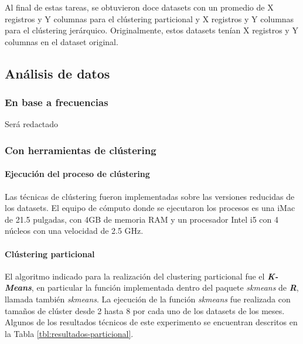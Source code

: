 \documentclass[12pt]{article}
\numberwithin{equation}{section}
\numberwithin{table}{section}
\numberwithin{figure}{section}
\begin{document}
Al final de estas tareas, se obtuvieron doce datasets con un promedio de X registros y Y columnas para el clústering particional y X registros y Y columnas para el clústering jerárquico. Originalmente, estos datasets tenían X registros y Y columnas en el dataset original.

\subsection{Análisis de datos}
\subsubsection{En base a frecuencias}
Será redactado
\subsubsection{Con herramientas de clústering}
\paragraph{Ejecución del proceso de clústering}
Las técnicas de clústering fueron implementadas sobre las versiones reducidas de los datasets. El equipo de cómputo donde se ejecutaron los procesos es una iMac de 21.5 pulgadas, con 4GB de memoria RAM y un procesador Intel i5 con 4 núcleos con una velocidad de 2.5 GHz.

\paragraph{Clústering particional}
El algoritmo indicado para la realización del clustering particional fue el \textbf{\emph{K-Means}}, en particular la función implementada dentro del paquete \emph{skmeans} de \emph{\textbf{R}}, llamada también \emph{skmeans}.
La ejecución de la función \emph{skmeans} fue realizada con tamaños de clúster desde 2 hasta 8 por cada uno de los datasets de los meses.
Algunos de los resultados técnicos de este experimento se encuentran descritos en la Tabla \ref{tbl:resultados-particional}.
\end{document}
